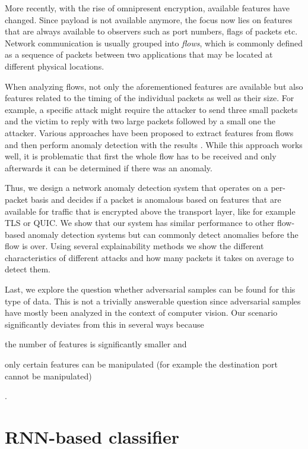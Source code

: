\documentclass[sigconf,nonacm]{acmart}
\begin{document}
More recently, with the rise of omnipresent encryption, available features have changed. Since payload is not available anymore, the focus now lies on features that are always available to observers such as port numbers, flags of packets etc. Network communication is usually grouped into \textit{flows}, which is commonly defined as a sequence of packets between two applications that may be located at different physical locations.

When analyzing flows, not only the aforementioned features are available but also features related to the timing of the individual packets as well as their size. For example, a specific attack might require the attacker to send three small packets and the victim to reply with two large packets followed by a small one the attacker. Various approaches have been proposed to extract features from flows and then perform anomaly detection with the results \cite{meghdouri_analysis_2018}. While this approach works well, it is problematic that first the whole flow has to be received and only afterwards it can be determined if there was an anomaly.

Thus, we design a network anomaly detection system that operates on a per-packet basis and decides if a packet is anomalous based on features that are available for traffic that is encrypted above the transport layer, like for example TLS or QUIC.
We show that our system has similar performance to other flow-based anomaly detection systems but can commonly detect anomalies before the flow is over. Using several explainability methods we show the different characteristics of different attacks and how many packets it takes on average to detect them.

Last, we explore the question whether adversarial samples can be found for this type of data. This is not a trivially answerable question since adversarial samples have mostly been analyzed in the context of computer vision. Our scenario significantly deviates from this in several ways because \begin{enumerate*}
\item the number of features is significantly smaller and
\item only certain features can be manipulated (for example the destination port cannot be manipulated)
\end{enumerate*}.

\section{RNN-based classifier}
\end{document}
